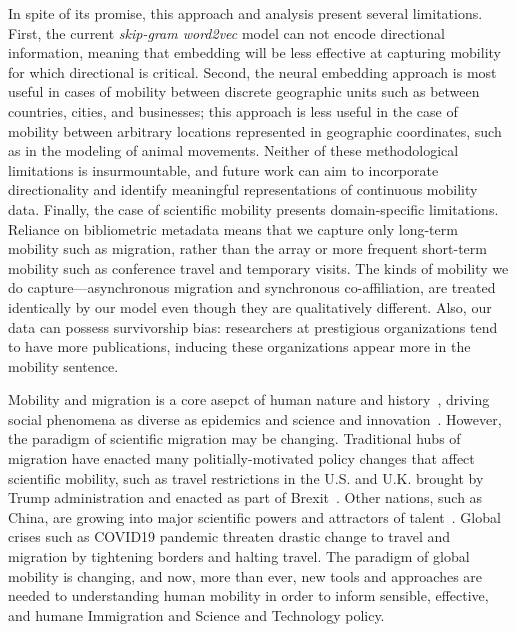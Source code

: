 \documentclass[12pt]{article} %
\begin{document}
In spite of its promise, this approach and analysis present several limitations. 
First, the current \textit{skip-gram word2vec} model can not encode directional information, meaning that embedding will be less effective at capturing mobility for which directional is critical.
Second, the neural embedding approach is most useful in cases of mobility between discrete geographic units such as between countries, cities, and businesses; this approach is less useful in the case of mobility between arbitrary locations represented in geographic coordinates, such as in the modeling of animal movements. 
Neither of these methodological limitations is insurmountable, and future work can aim to incorporate directionality and identify meaningful representations of continuous mobility data. 
Finally, the case of scientific mobility presents domain-specific limitations. 
Reliance on bibliometric metadata means that we capture only long-term mobility such as migration, rather than the array or more frequent short-term mobility such as conference travel and temporary visits. 
The kinds of mobility we do capture—asynchronous migration and synchronous co-affiliation, are treated identically by our model even though they are qualitatively different.
Also, our data can possess survivorship bias: researchers at prestigious organizations tend to have more publications, inducing these organizations appear more in the mobility sentence.


Mobility and migration is a core asepct of human nature and history~\autocite{shah2020migration}, driving social phenomena as diverse as epidemics\autocite{kraemer2020covid, truscott2012epidemicgravity, xia2005measlesgravity} and science and innovation~\autocite{kaiser2018innovation, armano2017innovation, sugimoto2017mostimpact, petersen2018multiscale, franzoni2014advantage, morgan2018prestige, rodrigues2016mobility}.
However, the paradigm of scientific migration may be changing.
Traditional hubs of migration have enacted many politially-motivated policy changes that affect scientific mobility, such as travel restrictions in the U.S. and U.K. brought by Trump administration and enacted as part of Brexit~\autocite{chinchilla2018travelban}.
Other nations, such as China, are growing into major scientific powers and attractors of talent~\autocite{tollefson2018china, cao2020returning}.
Global crises such as COVID19 pandemic threaten drastic change to travel and migration by tightening borders and halting travel. 
The paradigm of global mobility is changing, and now, more than ever, new tools and approaches are needed to understanding human mobility in order to inform sensible, effective, and humane Immigration and Science and Technology policy.
\end{document}
